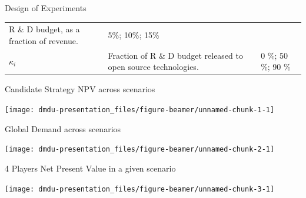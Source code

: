 \documentclass[12pt,ignorenonframetext,]{beamer}
\begin{document}
\begin{frame}{Design of Experiments}
\begin{longtable}[]{@{}lll@{}}
\begin{minipage}[t]{0.48\columnwidth}
R \& D budget, as a fraction of revenue.\strut
\end{minipage} & \begin{minipage}[t]{0.30\columnwidth}\raggedright
5\%; 10\%; 15\%\strut
\end{minipage}\tabularnewline
\begin{minipage}[t]{0.14\columnwidth}\raggedright
\(\kappa_i\)\strut
\end{minipage} & \begin{minipage}[t]{0.48\columnwidth}\raggedright
Fraction of R \& D budget released to open source technologies.\strut
\end{minipage} & \begin{minipage}[t]{0.30\columnwidth}\raggedright
0 \%; 50 \%; 90 \%\strut
\end{minipage}\tabularnewline
\bottomrule
\end{longtable}

\end{frame}

\begin{frame}{Candidate Strategy NPV across scenarios}
\protect\hypertarget{candidate-strategy-npv-across-scenarios}{}

\begin{center}\texttt{[image: dmdu-presentation\_files/figure-beamer/unnamed-chunk-1-1]} \end{center}

\end{frame}

\begin{frame}{Global Demand across scenarios}
\protect\hypertarget{global-demand-across-scenarios}{}

\begin{center}\texttt{[image: dmdu-presentation\_files/figure-beamer/unnamed-chunk-2-1]} \end{center}

\end{frame}

\begin{frame}{4 Players Net Present Value in a given scenario}
\protect\hypertarget{players-net-present-value-in-a-given-scenario}{}

\begin{center}\texttt{[image: dmdu-presentation\_files/figure-beamer/unnamed-chunk-3-1]} \end{center}

\end{frame}
\end{document}
